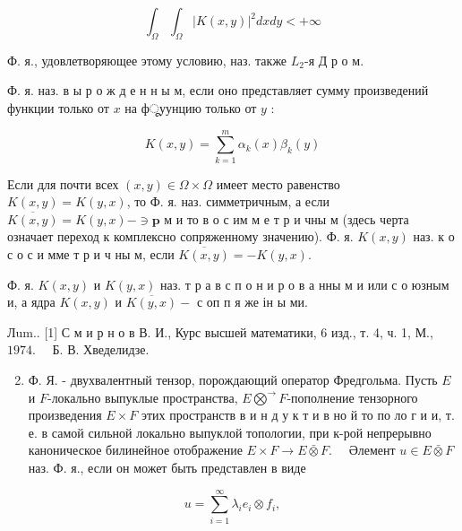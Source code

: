 \documentclass[10pt]{article}
\begin{document}
\[

\int_{\Omega} \int_{\Omega}|K(x, y)|^{2} d x d y<+\infty

\]



Ф. я., удовлетворяющее этому условию, наз. также $L_{2}$-я Д р о м.



Ф. я. наз. в ы р о ж д е н н ы м, если оно представляет сумму произведений функции только от $x$ на фूуунцию только от $y$ :



\[

K(x, y)=\sum_{k=1}^{m} \alpha_{k}(x) \beta_{k}(y)

\]



Если для почти всех $(x, y) \in \Omega \times \Omega$ имеет место равенство $K(x, y)=K(y, x)$, то Ф. я. наз. симметричным, а если $\overline{K(x, y)}=K(y, x)-\ni \mathbf{p}$ м и то в о с им м е т р и чны м (здесь черта означает переход к комплексно сопряженному значению). Ф. я. $K(x, y)$ наз. к о с о с и мме т р и ч ны м, если $\overline{K(x, y)}=-K(y, x)$.



Ф. я. $K(x, y)$ и $K(y, x)$ наз. т р а в с п о н и р о в а нны м и или с о юзным и, а ядра $K(x, y)$ и $\overline{K(y, x)}-$ с оп п я же ін ы ми.



Лum.. [1] С м и р н о в В. И., Курс высшей математики, 6 изд., т. 4, ч. 1, М., $1974 . \quad$ Б. В. Хведелидзе.



\begin{enumerate}

  \setcounter{enumi}{1}

  \item Ф. Я. - двухвалентный тензор, порождающий оператор Фредгольма. Пусть $E$ и $F$-локально выпуклые пространства, $E \vec{\bigotimes} F$-пополнение тензорного произведения $E \times F$ этих пространств в и н д у к т и в но й то по ло г и и, т. е. в самой сильной локально выпуклой топологии, при к-рой непрерывно каноническое билинейное отображение $E \times F \longrightarrow E \bar{\otimes} F . \quad$ Әлемент $u \in E \bar{\otimes} F$ наз. Ф. я., если он может быть представлен в виде

\end{enumerate}



\[

u=\sum_{i=1}^{\infty} \lambda_{i} e_{i} \otimes f_{i},

\]
\end{document}
